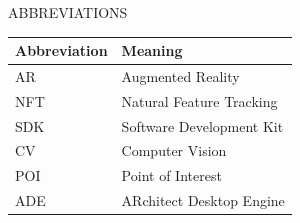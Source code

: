 \documentclass{article}
\begin{document}

\restoregeometry



\newpage
{
\tableofcontents
}
\newpage
\listoffigures



\newpage
\begin{center}
	\LARGE ABBREVIATIONS\\[1cm]
\end{center}

\renewcommand\arraystretch{1.3}
\renewcommand\tabcolsep{1cm}

\begin{center}
\renewcommand{\arraystretch}{2}
\begin{tabular}{| l | l |}
	\hline
	Abbreviation & Meaning\\
	\hline
	AR & Augmented Reality\\
	NFT & Natural Feature Tracking\\
	SDK & Software Development Kit\\
	CV & Computer Vision\\
	POI & Point of Interest\\
	ADE & ARchitect Desktop Engine\\
	\hline
\end{tabular}
\end{center}
\end{document}
